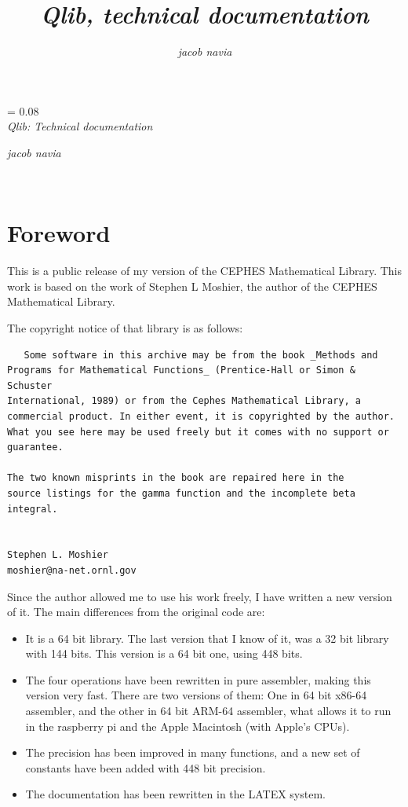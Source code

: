 \documentclass[10pt,a4paper,x11names]{memoir} %
\title{ \textsl{Qlib, technical documentation}}
\author{ \textsl{jacob navia}}
\newcounter{entry}
\newcommand*{\titleJT}{\begingroup%
	\drop = 0.08\textheight \vspace*{\drop}
	\hspace*{0.3\textwidth} {}\\[1\drop]
	\hspace*{0.2\textwidth}
	{\HUGE\itshape\raggedleft Qlib: Technical documentation}\par \vspace{13cm} {\raggedleft\Huge\itshape jacob navia\par} \vfill \hspace*{0.3\textwidth}{\Large \raggedleft }\\[0.5\baselineskip] \hspace*{0.3\textwidth}{\Large } \vspace*{\drop} \endgroup}
\newlength{\drop}
\begin{document}
\setcounter{tocdepth}{5}
\setcounter{entry}{1}
\pagestyle{empty} \titleJT
\cleardoublepage
\pagestyle{headings}
\tableofcontents


\lstset{language=C,numbers=left}
\chapter{Foreword}
This is a public release of my version of the CEPHES Mathematical Library. This work is based on the work of Stephen L Moshier, the author of the CEPHES Mathematical Library.

The copyright notice of that library is as follows:
\begin{verbatim}
   Some software in this archive may be from the book _Methods and
Programs for Mathematical Functions_ (Prentice-Hall or Simon & Schuster
International, 1989) or from the Cephes Mathematical Library, a
commercial product. In either event, it is copyrighted by the author.
What you see here may be used freely but it comes with no support or
guarantee.

The two known misprints in the book are repaired here in the
source listings for the gamma function and the incomplete beta
integral.


Stephen L. Moshier
moshier@na-net.ornl.gov
\end{verbatim}

Since the author allowed me to use his work freely, I have written a new version of it. The main differences from the original code are:
\begin{itemize}
	\item It is a 64 bit library. The last version that I know of it, was a 32 bit library with 144 bits. This version is a 64 bit one, using 448 bits.
	\item The four operations have been rewritten in pure assembler, making this version very fast. There are two versions of them: One in 64 bit x86-64 assembler, and the other in 64 bit ARM-64 assembler, what allows it to run in the raspberry pi and the 
	Apple Macintosh (with Apple's CPUs).
	\item The precision has been improved in many functions, and a new set of constants have been added with 448 bit precision.
	\item The documentation has been rewritten in the LATEX
	 system.
\end{itemize}
\end{document}
